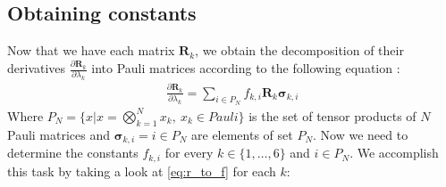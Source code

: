 \documentclass{aux/ttuthes2007}
\newcommand{\fpd}[2]{\frac{\partial #1}{\partial #2}}
\newcommand{\elec}{N}
\begin{document}
\subsection {\textbf{Obtaining constants}}
%
Now that we have each matrix $\bm R_k$, we obtain the decomposition of their derivatives $\fpd{\bm R_k}{\lambda_k}$ into Pauli matrices according to the following equation \cite{benjamin}:
%
\begin{equation}\label{eq:r_to_f}
\begin{split}
	\fpd{\bm R_k}{\lambda_k} = \sum_{i \in P_\elec} f_{k, i} \bm R_k \bm \sigma_{k, i}
\end{split}
\end{equation}
%
Where $P_\elec = \{x \vert x = \bigotimes_{k = 1}^{\elec} x_k,\ x_k \in Pauli\}$ is the set of tensor products of $\elec$ Pauli matrices and $ \bm \sigma_{k, i} = i \in P_\elec$ are elements of set $P_\elec$.
Now we need to determine the constants $f_{k, i}$ for every $k \in \{1, \ldots, 6\}$ and $i \in P_\elec$. We accomplish this task by taking a look at \ref{eq:r_to_f} for each $k$:
%
\end{document}
